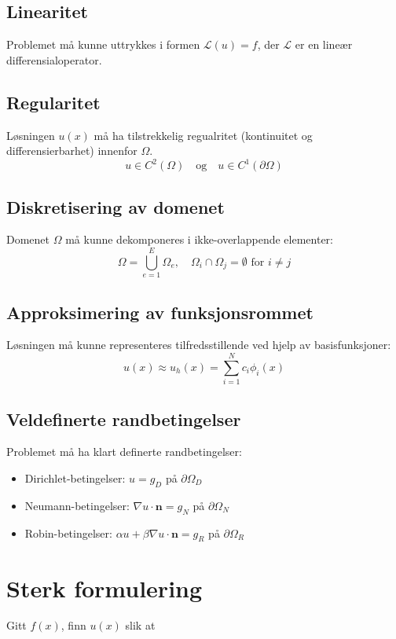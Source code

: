 \documentclass[../main.tex]{subfiles}
\begin{document}
\subsection{Linearitet} Problemet må kunne uttrykkes i formen \(\mathcal{L}(u) = f\), der \(\mathcal{L}\) er en lineær differensialoperator.

\subsection{Regularitet} Løsningen \( u(x) \) må ha tilstrekkelig regualritet (kontinuitet og differensierbarhet) innenfor \( \Omega \).
\[
    u \in C^2(\Omega) \quad \text{og} \quad u \in C^1(\partial \Omega)
\]

\subsection{Diskretisering av domenet} Domenet \( \Omega \) må kunne dekomponeres i ikke-overlappende elementer:
\[
    \Omega = \bigcup_{e=1}^{E} \Omega_e, \quad \Omega_i \cap \Omega_j = \emptyset \text{ for } i \neq j
\]

\subsection{Approksimering av funksjonsrommet}
Løsningen må kunne representeres tilfredsstillende ved hjelp av basisfunksjoner:
\[
    u(x) \approx u_h(x) = \sum_{i=1}^{N} c_i \phi_i(x)
\]

\subsection{Veldefinerte randbetingelser}
Problemet må ha klart definerte randbetingelser:
\begin{itemize}
    \item Dirichlet-betingelser: \( u = g_D \) på \(\partial \Omega_D \)
    \item Neumann-betingelser: \( \nabla u \cdot \mathbf{n} = g_N \) på \(\partial \Omega_N \)
    \item Robin-betingelser: \( \alpha u + \beta \nabla u \cdot \mathbf{n} = g_R \) på \(\partial \Omega_R \)
\end{itemize}

\section{Sterk formulering}
Gitt $f(x)$, finn $u(x)$ slik at
\end{document}
